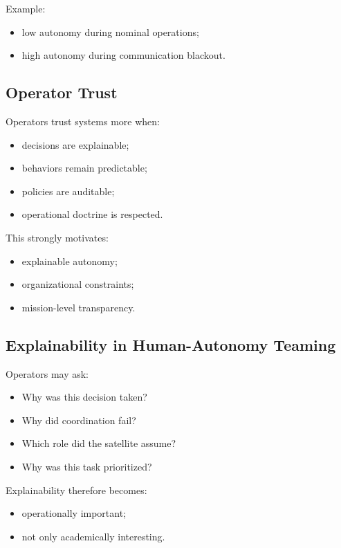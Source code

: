 \documentclass[10pt,a4paper,twocolumn]{article}
\begin{document}
Example:
\begin{itemize}
    \item low autonomy during nominal operations;
    \item high autonomy during communication blackout.
\end{itemize}


\subsection{Operator Trust}

Operators trust systems more when:
\begin{itemize}
    \item decisions are explainable;
    \item behaviors remain predictable;
    \item policies are auditable;
    \item operational doctrine is respected.
\end{itemize}

This strongly motivates:
\begin{itemize}
    \item explainable autonomy;
    \item organizational constraints;
    \item mission-level transparency.
\end{itemize}


\subsection{Explainability in Human-Autonomy Teaming}

Operators may ask:
\begin{itemize}
    \item Why was this decision taken?
    \item Why did coordination fail?
    \item Which role did the satellite assume?
    \item Why was this task prioritized?
\end{itemize}

Explainability therefore becomes:
\begin{itemize}
    \item operationally important;
    \item not only academically interesting.
\end{itemize}
\end{document}
